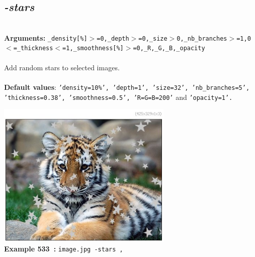 \documentclass[a4paper,11pt,twoside]{book}
\begin{document}
\subsection{\emph{-stars} }\vspace*{-0.5em}
~\\\textbf{Arguments: } 
{\small \texttt{\_density[\%]$>$=0,\_depth$>$=0,\_size$>$0,\_nb\_branches$>$=1,0$<$=\_thickness$<$=1,\_smoothness[\%]$>$=0,\_R,\_G,\_B,\_opacity}}\\~\\
Add random stars to selected images.
~\\~\\\textbf{Default values}: {\small \texttt{'density=10\%', 'depth=1', 'size=32', 'nb\_branches=5', 'thickness=0.38', 'smoothness=0.5', 'R=G=B=200'} and \texttt{'opacity=1'.}}
\begin{center}\includegraphics[keepaspectratio=true,height=7cm,width=\textwidth]{img/gmic_def533.jpg}\\
{\footnotesize \textbf{Example 533~:} \texttt{image.jpg -stars ,}}
\end{center}
\end{document}

